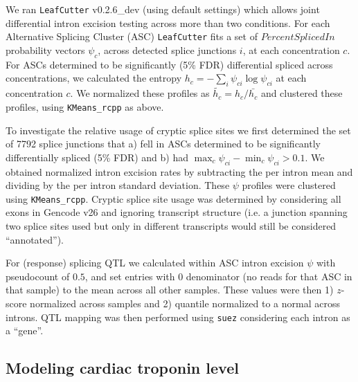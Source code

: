 \documentclass{article}
\begin{document}
We ran \texttt{LeafCutter} v0.2.6\_dev (using default settings) which allows joint differential intron excision testing across more than two conditions. For each Alternative Splicing Cluster (ASC) \texttt{LeafCutter} fits a set of $Percent Spliced In$ probability vectors $\psi_{c}$, across detected splice junctions $i$, at each concentration $c$. For ASCs determined to be significantly (5\% FDR) differential spliced across concentrations, we calculated the entropy $h_c = -\sum_i \psi_{ci} \log \psi_{ci}$ at each concentration $c$. We normalized these profiles as $\tilde{h_c} = h_c / \bar{h_c}$ and clustered these profiles, using \texttt{KMeans\_rcpp} as above. 

To investigate the relative usage of cryptic splice sites we first determined the set of 7792 splice junctions that a) fell in ASCs determined to be significantly differentially spliced (5\% FDR) and b) had $\max_c \psi_{ci} - \min_c \psi_{ci} > 0.1$. We obtained normalized intron excision rates by subtracting the per intron mean and dividing by the per intron standard deviation. These $\psi$ profiles were clustered using \texttt{KMeans\_rcpp}. Cryptic splice site usage was determined by considering all exons in Gencode v26 and ignoring transcript structure (i.e. a junction spanning two splice sites used but only in different transcripts would still be considered ``annotated''). 

For (response) splicing QTL we calculated within ASC intron excision $\psi$ with pseudocount of $0.5$, and set entries with $0$ denominator (no reads for that ASC in that sample) to the mean across all other samples. These values were then 1) $z$-score normalized across samples and 2) quantile normalized to a normal across introns. QTL mapping was then performed using \texttt{suez} considering each intron as a ``gene''. 

\subsection*{Modeling cardiac troponin level}
\end{document}
